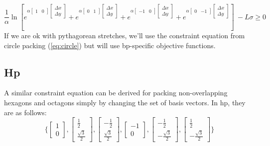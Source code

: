 \documentclass[12pt]{article}
\begin{document}
\begin{equation}\label{eq:bp full}
    \frac{1}{\alpha}\ln\left[e^{\alpha \begin{bmatrix}1 & 0\end{bmatrix}\begin{bmatrix}
        \Delta x\\
        \Delta y
        \end{bmatrix}} + e^{\alpha \begin{bmatrix}0 & 1\end{bmatrix}\begin{bmatrix}
        \Delta x\\
        \Delta y
        \end{bmatrix}} + e^{\alpha \begin{bmatrix}-1 & 0\end{bmatrix}\begin{bmatrix}
        \Delta x\\
        \Delta y
        \end{bmatrix}} + e^{\alpha \begin{bmatrix}0 & -1\end{bmatrix}\begin{bmatrix}
        \Delta x\\
        \Delta y
        \end{bmatrix}}\right]\ - L\sigma \geq 0 
\end{equation}
If we are ok with pythagorean stretches, we'll use the constraint equation from circle packing (\ref{eq:circle}) but will use bp-specific objective functions.

\subsection{Hp}
A similar constraint equation can be derived for packing non-overlapping hexagons and octagons simply by changing the set of basis vectors. In hp, they are as follows:
\[
\{
    \begin{bmatrix}1\\0\end{bmatrix},
    \begin{bmatrix}\frac{1}{2}\\\frac{\sqrt{3}}{2}\end{bmatrix},
    \begin{bmatrix}-\frac{1}{2}\\\frac{\sqrt{3}}{2}\end{bmatrix},
    \begin{bmatrix}-1\\0\end{bmatrix},
    \begin{bmatrix}-\frac{1}{2}\\-\frac{\sqrt{3}}{2}\end{bmatrix},
    \begin{bmatrix}\frac{1}{2}\\-\frac{\sqrt{3}}{2}\end{bmatrix}
\}
\]
\end{document}
